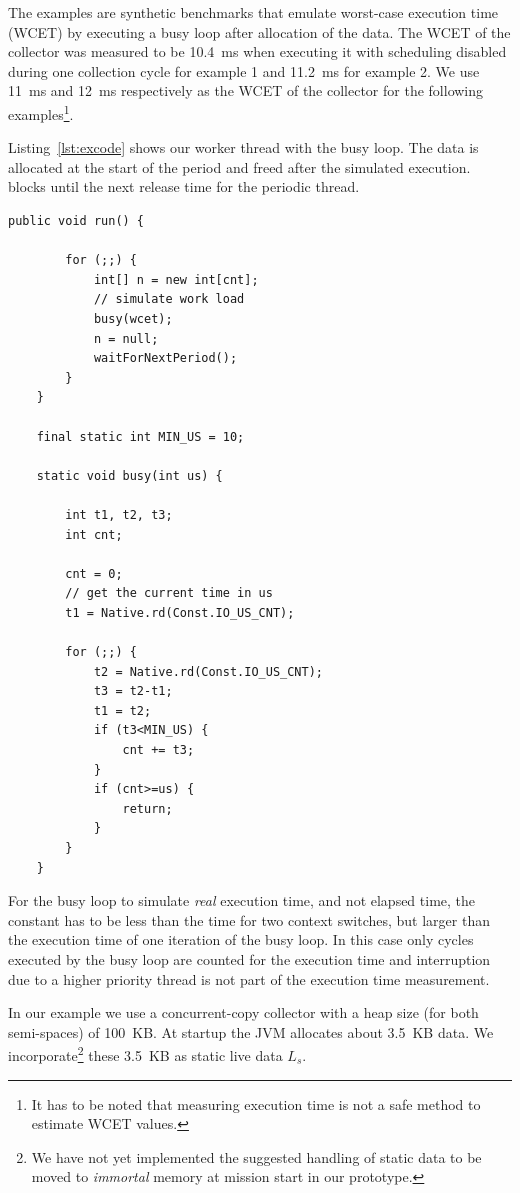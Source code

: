 The examples are synthetic benchmarks that emulate worst-case
execution time (WCET) by executing a busy loop after allocation of
the data. The WCET of the collector was measured to be 10.4~ms when
executing it with scheduling disabled during one collection cycle for
example 1 and 11.2~ms for example 2. We use 11~ms and 12~ms
respectively as the WCET of the collector for the following
examples\footnote{It has to be noted that measuring execution time is
not a safe method to estimate WCET values.}.


Listing~\ref{lst:excode} shows our worker thread with the busy loop.
The data is allocated at the start of the period and freed after the
simulated execution.  blocks until the next
release time for the periodic thread.

\begin{lstlisting}[float, caption={Example periodic thread with a busy loop},
label=lst:excode]
    public void run() {

        for (;;) {
            int[] n = new int[cnt];
            // simulate work load
            busy(wcet);
            n = null;
            waitForNextPeriod();
        }
    }

    final static int MIN_US = 10;

    static void busy(int us) {

        int t1, t2, t3;
        int cnt;

        cnt = 0;
        // get the current time in us
        t1 = Native.rd(Const.IO_US_CNT);

        for (;;) {
            t2 = Native.rd(Const.IO_US_CNT);
            t3 = t2-t1;
            t1 = t2;
            if (t3<MIN_US) {
                cnt += t3;
            }
            if (cnt>=us) {
                return;
            }
        }
    }
\end{lstlisting}

For the busy loop to simulate \emph{real} execution time, and not
elapsed time, the constant  has to be less than the
time for two context switches, but larger than the execution time of
one iteration of the busy loop. In this case only cycles executed by
the busy loop are counted for the execution time and interruption
due to a higher priority thread is not part of the execution time
measurement.

In our example we use a concurrent-copy collector with a heap size
(for both semi-spaces) of 100~KB. At startup the JVM allocates about
3.5~KB data. We incorporate\footnote{We have not yet implemented the
suggested handling of static data to be moved to \emph{immortal}
memory at mission start in our prototype.} these 3.5~KB as static
live data $L_s$.



